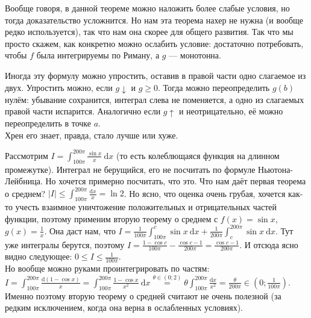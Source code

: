 \documentclass{article}
\begin{document}
\begin{itemize}
\begin{Proof}
        \end{Proof}
        \begin{Comment}
            Вообще говоря, в данной теореме можно наложить более слабые условия, но тогда доказательство усложнится. Но нам эта теорема нахер не нужна (и вообще редко используется), так что нам она скорее для общего развития. Так что мы просто скажем, как конкретно можно ослабить условие: достаточно потребовать, чтобы $f$ была интегрируемы по Риману, а $g$ --- монотонна.
        \end{Comment}
        \begin{Comment}
            Иногда эту формулу можно упростить, оставив в правой части одно слагаемое из двух. Упростить можно, если $g\downarrow$ и $g\geqslant0$. Тогда можно переопределить $g(b)$ нулём: убывание сохранится, интеграл слева не поменяется, а одно из слагаемых правой части испарится. Аналогично если $g\uparrow$ и неотрицательно, её можно переопределить в точке $a$.\\
            Хрен его знает, правда, стало лучше или хуже.
        \end{Comment}
        \begin{Example}
            Рассмотрим $I=\int_{100\pi}^{200\pi}\frac{\sin x}x~\mathrm dx$ (то есть колеблющаяся функция на длинном промежутке). Интеграл не берущийся, его не посчитать по формуле Ньютона-Лейбница. Но хочется примерно посчитать, что это. Что нам даёт первая теорема о среднем? $|I|\leqslant \int_{100\pi}^{200\pi}\frac{\mathrm dx}{x}=\ln2$. Но ясно, что оценка очень грубая, хочется как-то учесть взаимное уничтожение положительных и отрицательных частей функции, поэтому применим вторую теорему о среднем с $f(x)=\sin x$, $g(x)=\frac1x$. Она даст нам, что $I=\frac1{100\pi}\int_{100\pi}^c\sin x~\mathrm dx+\frac1{200\pi}\int_c^{200\pi}\sin x~\mathrm dx$. Тут уже интегралы берутся, поэтому $I=\frac{1-\cos c}{100\pi}-\frac{\cos c-1}{200\pi}=\frac{\cos c-1}{200\pi}$. И отсюда ясно видно следующее: $0\leqslant I\leqslant\frac1{100\pi}$.\\
            Но вообще можно руками проинтегрировать по частям: $I=\int_{100\pi}^{200\pi}\frac{\mathrm d(1-\cos x)}x=\int_{100\pi}^{200\pi}\frac{1-\cos x}{x^2}~\mathrm dx\overset{\theta\in(0;2)}=\theta\int_{100\pi}^{200\pi}\frac{\mathrm dx}{x^2}=\frac\theta{200\pi}\in\left(0;\frac1{100\pi}\right)$.\\
            Именно поэтому вторую теорему о средней считают не очень полезной (за редким исключением, когда она верна в ослабленных условиях).
        \end{Example}
    \end{itemize}
\end{document}
